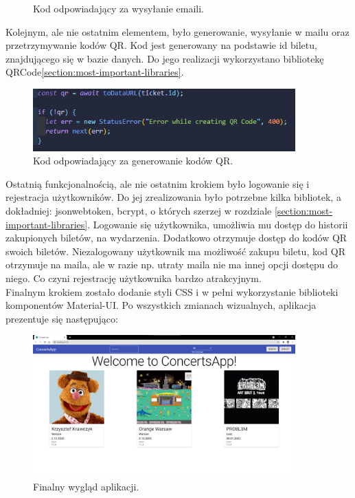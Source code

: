 \documentclass[12pt]{article}
\begin{document}
\begin{sloppypar}
{\begin{figure}[H]
    \caption{Kod odpowiadający za wysyłanie emaili.}
    \label{fig:sending-email}
  \end{figure}
  Kolejnym, ale nie ostatnim elementem, było generowanie, wysyłanie w mailu oraz przetrzymywanie kodów QR. 
  Kod jest generowany na podstawie id biletu, znajdującego się w bazie danych. 
  Do jego realizacji wykorzystano bibliotekę QRCode\ref{section:most-important-libraries}.
  \begin{figure}[H]
    \centering
    \includegraphics[width=0.9\textwidth]{Creation_process/qrcode.PNG}
    \caption{Kod odpowiadający za generowanie kodów QR.}
    \label{fig:qr-code}
  \end{figure}
  Ostatnią funkcjonalnością, ale nie ostatnim krokiem było logowanie się i rejestracja użytkowników. 
  Do jej zrealizowania było potrzebne kilka bibliotek, a dokładniej: jsonwebtoken, bcrypt, o których szerzej w rozdziale \ref{section:most-important-libraries}. 
  Logowanie się użytkownika, umożliwia mu dostęp do historii zakupionych biletów, na wydarzenia. Dodatkowo otrzymuje dostęp do kodów QR swoich biletów. 
  Niezalogowany użytkownik ma możliwość zakupu biletu, kod QR otrzymuje na maila, ale w razie np. utraty maila nie ma innej opcji dostępu do niego. 
  Co czyni rejestrację użytkownika bardzo atrakcyjnym.\\
  Finalnym krokiem zostało dodanie styli CSS i w pełni wykorzystanie biblioteki komponentów Material-UI. 
  Po wszystkich zmianach wizualnych, aplikacja prezentuje się następująco:
  \begin{figure}[H]
    \centering
    \includegraphics[width=0.9\textwidth]{client_app/home.png}
    \caption{Finalny wygląd aplikacji.}
    \label{fig:final-view}
  \end{figure}
}


\end{sloppypar}
\end{document}
